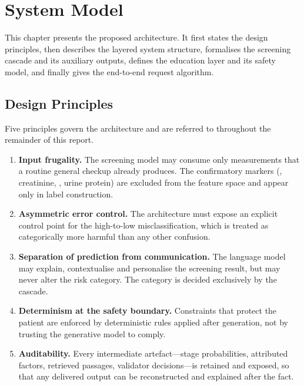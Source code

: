 \chapter{System Model}
\label{ch:system}

This chapter presents the proposed architecture. It first states the design
principles, then describes the layered system structure, formalises the
screening cascade and its auxiliary outputs, defines the education layer and
its safety model, and finally gives the end-to-end request algorithm.

\section{Design Principles}
\label{sec:principles}

Five principles govern the architecture and are referred to throughout the
remainder of this report.

\begin{enumerate}
  \item \textbf{Input frugality.} The screening model may consume only
        measurements that a routine general checkup already produces. The
        confirmatory markers (\eGFR, creatinine, \UACR, urine protein) are
        excluded from the feature space and appear only in label construction.
  \item \textbf{Asymmetric error control.} The architecture must expose an
        explicit control point for the high-to-low misclassification, which is
        treated as categorically more harmful than any other confusion.
  \item \textbf{Separation of prediction from communication.} The language
        model may explain, contextualise and personalise the screening result,
        but may never alter the risk category. The category is decided
        exclusively by the cascade.
  \item \textbf{Determinism at the safety boundary.} Constraints that protect
        the patient are enforced by deterministic rules applied after
        generation, not by trusting the generative model to comply.
  \item \textbf{Auditability.} Every intermediate artefact---stage
        probabilities, attributed factors, retrieved passages, validator
        decisions---is retained and exposed, so that any delivered output can be
        reconstructed and explained after the fact.
\end{enumerate}

